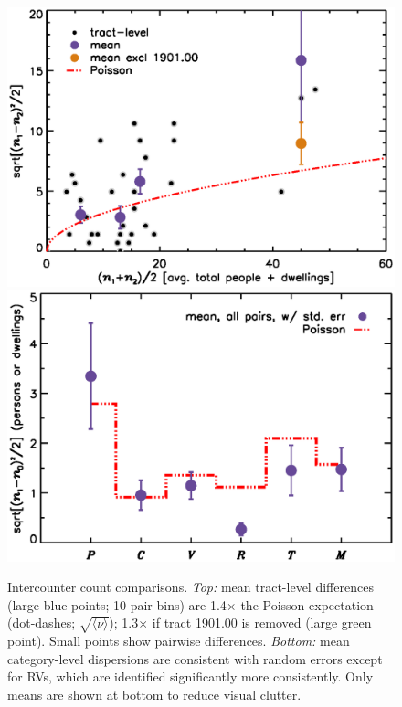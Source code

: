 \documentclass[11pt,twocolumn]{article}
\begin{document}
\begin{figure}[t]
\centering
	\includegraphics[width=\linewidth, trim = 1cm 0cm 0cm 0cm]{intDupeChar}\\
	\includegraphics[width=\linewidth, trim = 1cm 0.5cm 0cm 0cm]{catDupeChar}
\caption{Intercounter count comparisons. {\it Top:} mean tract-level differences (large blue 
		points; 10-pair bins) are 1.4$\times$ the Poisson expectation (dot-dashes; 
		$\sqrt{\langle\nu\rangle}$); 1.3$\times$ if tract 1901.00 is removed (large green 
		point). Small points show pairwise differences. {\it Bottom:} mean category-level 
		dispersions are consistent with random errors except for RVs, which are identified 
		significantly more consistently. Only means are shown at bottom to reduce visual
		clutter.}
\label{fig:dupeChar}
\end{figure}
\end{document}
